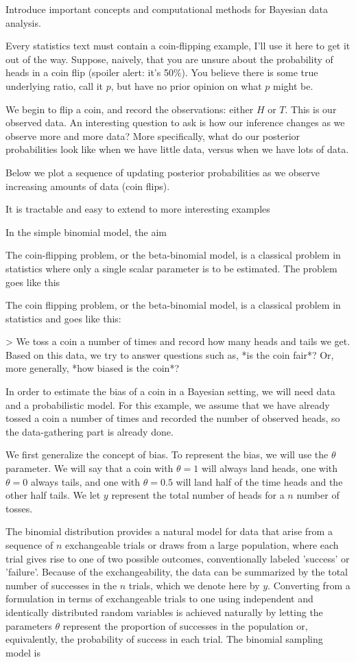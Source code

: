 Introduce important concepts and computational methods for Bayesian data analysis. 



Every statistics text must contain a coin-flipping example, I'll use it here to get it out of the way. Suppose, naively, that you are unsure about the probability of heads in a coin flip (spoiler alert: it's 50\%). You believe there is some true underlying ratio, call it $p$, but have no prior opinion on what $p$ might be.

We begin to flip a coin, and record the observations: either $H$ or $T$. This is our observed data. An interesting question to ask is how our inference changes as we observe more and more data? More specifically, what do our posterior probabilities look like when we have little data, versus when we have lots of data.

Below we plot a sequence of updating posterior probabilities as we observe increasing amounts of data (coin flips).

It is tractable and easy to extend to more interesting examples

In the simple binomial model, the aim 

The coin-flipping problem, or the beta-binomial model, is a classical problem in statistics where only a single scalar parameter is to be estimated. The problem goes like this


The coin flipping problem, or the beta-binomial model, is a classical problem in statistics and goes like this: 

> We toss a coin a number of times and record how many heads and tails we get. Based on this data, we try to answer questions such as, *is the coin fair*? Or, more generally, *how biased is the coin*? 

In order to estimate the bias of a coin in a Bayesian setting, we will need data and a probabilistic model. For this example, we assume that we have already tossed a coin a number of times and recorded the number of observed heads, so the data-gathering part is already done.

We first generalize the concept of bias. To represent the bias, we will use the $\theta$ parameter. We will say that a coin with $\theta = 1$ will always land heads, one with $\theta=0$ always tails, and one with $\theta=0.5$ will land half of the time heads and the other half tails. We let $y$ represent the total number of heads for a $n$ number of tosses. 


The binomial distribution provides a natural model for data that arise from a sequence of $n$ exchangeable trials or draws from a large population, where each trial gives rise to one of two possible outcomes, conventionally labeled 'success' or 'failure'. Because of the exchangeability, the data can be summarized by the total number of successes in the $n$ trials, which we denote here by $y$. Converting from a formulation in terms of exchangeable trials to one using independent and identically distributed random variables is achieved naturally by letting the parameters $\theta$ represent the proportion of successes in the population or, equivalently, the probability of success in each trial. The binomial sampling model is 

